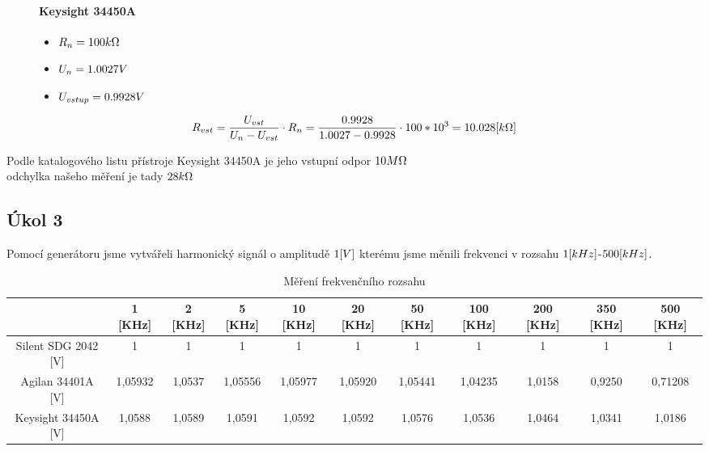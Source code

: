 \documentclass{article}
\begin{document}
\begin{figure}[H]
    \begin{minipage}[t]{0.3\textwidth}
        \paragraph{Keysight 34450A}
        \begin{itemize}
            \item \(R_n = 100\-k\Omega\) 
            \item \(U_n = 1.0027\-V\) 
            \item \(U_{vstup} = 0.9928\-V\) 
        \end{itemize}
    \end{minipage}
    \hfill
    \begin{minipage}[t]{0.7\textwidth}
        \vspace{5mm}
        \begin{equation}
            R_{vst} = \frac{U_{vst}}{U_{n}-U_{vst}}\cdot R_n = \frac{0.9928}{1.0027-0.9928}\cdot 100*10^3 = 10.028\-[k\Omega]  
        \end{equation}
    \end{minipage}
\end{figure}
Podle katalogového listu přístroje Keysight 34450A je jeho vstupní odpor \(10\-M\Omega \)\\odchylka našeho měření je tady \(28\-k\Omega\)

\subsection{Úkol 3}
Pomocí generátoru jsme vytvářeli harmonický signál o amplitudě \(1\-[V]\) kterému jsme měnili frekvenci v rozsahu \(1\-[kHz]\)-\(500\-[kHz]\).\\ 
\begin{table}[H]
    \footnotesize
    \vspace{-6mm}
    \hspace{-8mm}
    \begin{tabular}{|c|c|c|c|c|c|c|c|c|c|c|}
    \hline
                        & 1 [KHz]  	& 2 [KHz]	& 5 [KHz]	& 10 [KHz]	& 20 [KHz]	& 50 [KHz]	& 100 [KHz]	& 200 [KHz]	& 350 [KHz]	& 500 [KHz] \\ \hline
    Silent SDG 2042 [V]	& 1	        & 1	        & 1      	& 1   	    & 1   	    & 1   	    & 1   	    & 1	        & 1   	    & 1         \\ \hline
    Agilan 34401A   [V]	& 1,05932	& 1,0537	& 1,05556	& 1,05977	& 1,05920	& 1,05441	& 1,04235	& 1,0158	& 0,9250	& 0,71208   \\ \hline
    Keysight 34450A [V]	& 1,0588	& 1,0589	& 1,0591	& 1,0592	& 1,0592	& 1,0576	& 1,0536	& 1,0464	& 1,0341	& 1,0186    \\ \hline
    \end{tabular}
    \caption{\label{frekvencni_rozsah} Měření frekvenčního rozsahu}
    \normalsize
\end{table}
\end{document}
